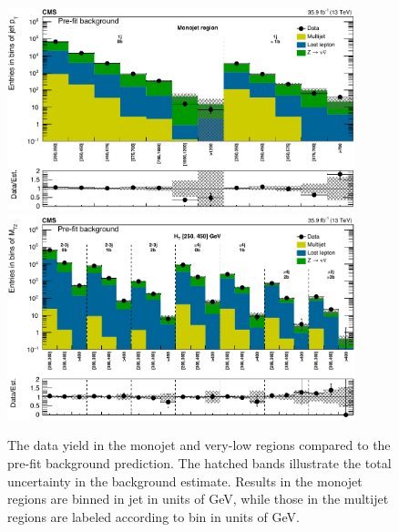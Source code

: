 \begin{figure}
	\centering
	\includegraphics[width=0.90\textwidth]{results/figs/mt2_monojet_fullEstimate}
	\includegraphics[width=0.90\textwidth]{results/figs/mt2_veryLowHT_fullEstimate}
	\renewcommand{\baselinestretch}{1.0}
	\caption[The data yield in the monojet and very-low \HT regions compared to the pre-fit background prediction.]{The data yield in the monojet and very-low \HT regions compared to the pre-fit background prediction. The hatched bands illustrate the total uncertainty in the background estimate. Results in the monojet regions are binned in jet \pt in units of GeV, while those in the multijet regions are labeled according to \mttwo bin in units of GeV.}
	\label{fig:yieldPrefit1}
\end{figure}
